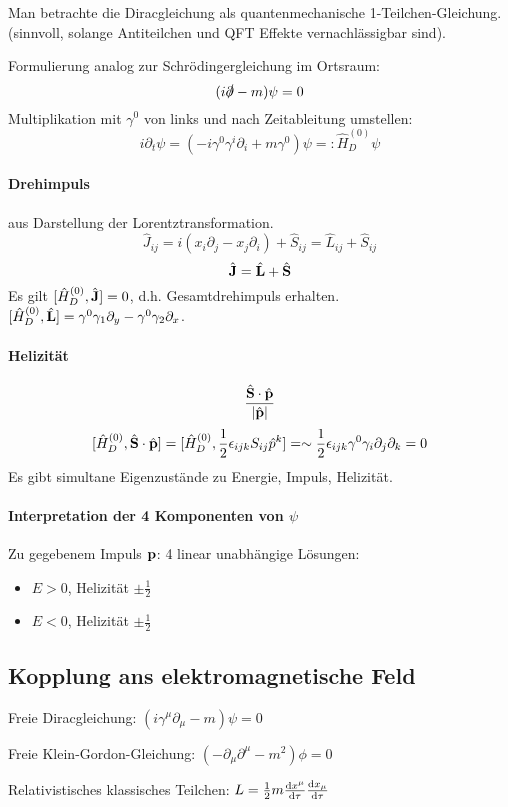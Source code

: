 \documentclass[11pt,a4paper]{report}
\begin{document}
Man betrachte die Diracgleichung als quantenmechanische 1-Teilchen-Gleichung. (sinnvoll, solange Antiteilchen und QFT Effekte vernachlässigbar sind).\par 

Formulierung analog zur Schrödingergleichung im Ortsraum:
$$(i\slashed{\partial} - m)\psi = 0$$
Multiplikation mit $\gamma^0$ von links und nach Zeitableitung umstellen:
$$i\partial_t\psi = (-i\gamma^0\gamma^i\partial_i+m\gamma^0)\psi =:\hat{H}^{(0)}_D\psi$$
\paragraph{Drehimpuls} aus Darstellung der Lorentztransformation.
$$\hat{J}_{ij}=i(x_i\partial_j-x_j\partial_i)+\hat{S}_{ij} = \hat{L}_{ij}+\hat{S}_{ij}$$
$$\hat{\mathbf{J}}=\hat{\mathbf{L}}+\hat{\mathbf{S}}$$
Es gilt $[\hat{H}^{(0)}_D,\hat{\mathbf{J}}]=0$, d.h. Gesamtdrehimpuls erhalten. $[\hat{H}^{(0)}_D,\hat{\mathbf{L}}]=\gamma^0\gamma_1\partial_y-\gamma^0\gamma_2\partial_x$.
\paragraph{Helizität}
$$\frac{\hat{\mathbf{S}}\cdot\hat{\mathbf{p}}}{|\hat{\mathbf{p}}|}$$
$$[\hat{H}^{(0)}_D, \hat{\mathbf{S}}\cdot\hat{\mathbf{p}}]=[\hat{H}^{(0)}_D,\frac{1}{2}\epsilon_{ijk}S_{ij}\hat{p}^k]=\sim\frac{1}{2}\epsilon_{ijk}\gamma^0\gamma_i\partial_j\partial_k=0$$
Es gibt simultane Eigenzustände zu Energie, Impuls, Helizität.

\paragraph{Interpretation der 4 Komponenten von $\psi$}\mbox{}\par 
Zu gegebenem Impuls $\mathbf{p}$: 4 linear unabhängige Lösungen:
\begin{itemize}
\item $E>0$, Helizität $\pm\frac{1}{2}$
\item $E<0$, Helizität $\pm\frac{1}{2}$
\end{itemize}

\subsection{Kopplung ans elektromagnetische Feld}

Freie Diracgleichung: $(i\gamma^\mu\partial_\mu -m)\psi = 0$\par 
Freie Klein-Gordon-Gleichung: $(-\partial_\mu\partial^\mu - m^2)\phi = 0$\par 
Relativistisches klassisches Teilchen: $L=\frac{1}{2}m\frac{\mathrm{d} x^\mu}{\mathrm{d}\tau}\frac{\mathrm{d} x_\mu}{\mathrm{d}\tau}$
\end{document}
